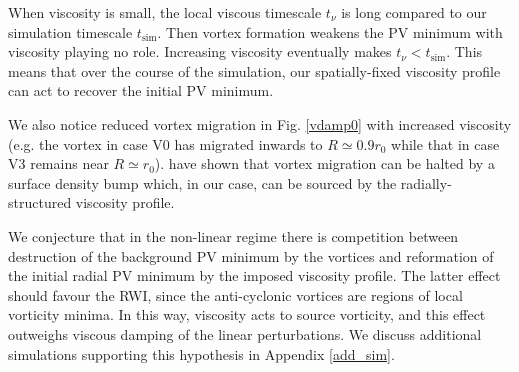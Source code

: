 When viscosity is small, the local viscous timescale $t_\nu$ is long compared to our
simulation timescale $t_\mathrm{sim}$. Then vortex formation weakens the PV minimum
with viscosity playing no role. Increasing viscosity eventually makes 
$t_\nu<t_\mathrm{sim}$. This means that over the course of the
simulation, our spatially-fixed viscosity profile can act to recover the
initial PV minimum. 

 We also notice reduced vortex migration in Fig. \ref{vdamp0}
  with increased viscosity (e.g. the vortex in case V0 has migrated
  inwards to $R\simeq0.9r_0$ while that in case V3 remains near
  $R\simeq r_0$). \cite{paardekooper10} have shown that vortex migration can be halted by
  a surface density bump which, in our case, can 
  be sourced by the radially-structured viscosity profile.   

We conjecture that in the non-linear regime there is competition 
between destruction of the background PV minimum by the 
vortices and reformation of the initial radial PV minimum by the
imposed viscosity profile. The latter effect should favour the RWI,
since the anti-cyclonic vortices are regions of local vorticity
minima. In this way, viscosity acts to source vorticity, and this
effect outweighs viscous damping of the linear perturbations. We
  discuss additional simulations supporting this hypothesis in
  Appendix \ref{add_sim}.     

